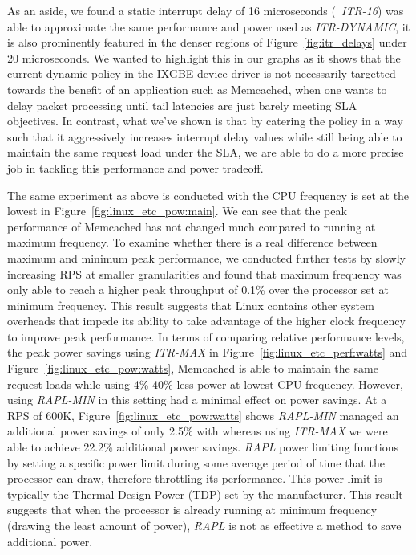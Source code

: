\documentclass[letterpaper,twocolumn,10pt]{article}
\begin{document}
As an aside, we found a static interrupt delay of 16 microseconds (~\textit{ITR-16}) was able to approximate the same performance and power used as \textit{ITR-DYNAMIC}, it is also prominently featured in the denser regions of Figure~\ref{fig:itr_delays} under 20 microseconds. We wanted to highlight this in our graphs as it shows that the current dynamic policy in the IXGBE device driver is not necessarily targetted towards the benefit of an application such as Memcached, when one wants to delay packet processing until tail latencies are just barely meeting SLA objectives. In contrast, what we've shown is that by catering the policy in a way such that it aggressively increases interrupt delay values while still being able to maintain the same request load under the SLA, we are able to do a more precise job in tackling this performance and power tradeoff.

The same experiment as above is conducted with the CPU frequency is set at the lowest in Figure~\ref{fig:linux_etc_pow:main}. We can see that the peak performance of Memcached has not changed much compared to running at maximum frequency. To examine whether there is a real difference between maximum and minimum peak performance, we conducted further tests by slowly increasing RPS at smaller granularities and found that maximum frequency was only able to reach a higher peak throughput of 0.1\% over the processor set at minimum frequency. This result suggests that Linux contains other system overheads that impede its ability to take advantage of the higher clock frequency to improve peak performance. In terms of comparing relative performance levels, the peak power savings using \textit{ITR-MAX} in Figure~\ref{fig:linux_etc_perf:watts} and Figure~\ref{fig:linux_etc_pow:watts}, Memcached is able to maintain the same request loads while using 4\%-40\% less power at lowest CPU frequency. However, using \textit{RAPL-MIN} in this setting had a minimal effect on power savings. At a RPS of 600K, Figure~\ref{fig:linux_etc_pow:watts} shows \textit{RAPL-MIN} managed an additional power savings of only 2.5\% with whereas using \textit{ITR-MAX} we were able to achieve 22.2\% additional power savings. \textit{RAPL} power limiting functions by setting a specific power limit during some average period of time that the processor can draw, therefore throttling its performance. This power limit is typically the Thermal Design Power (TDP) set by the manufacturer. This result suggests that when the processor is already running at minimum frequency (drawing the least amount of power), \textit{RAPL} is not as effective a method to save additional power.
\end{document}
